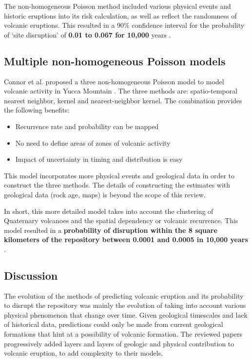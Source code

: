 \documentclass[12pt]{article}
\begin{document}
The non-homogeneous Poisson method included various physical events and historic eruptions
into its risk calculation, as well as reflect the randomness of volcanic eruptions.
This resulted in a 90\% confidence interval for the probability of `site disruption'
of \textbf{0.01 to 0.067 for 10,000} years \cite{ho_risk_1992}.

\subsection{Multiple non-homogeneous Poisson models}
Connor et al. proposed a three non-homogeneous Poisson model
to model volcanic activity in Yucca Mountain \cite{connor_three_1995}.
The three methods are: spatio-temporal nearest neighbor,
kernel and nearest-neighbor kernel. The combination provides
the following benefits:
\begin{itemize}
    \item Recurrence rate and probability can be mapped \\
    \item No need to define areas of zones of volcanic activity \\
    \item Impact of uncertainty in timing and distribution is easy \\
\end{itemize}

This model incorporates more physical events and geological data 
in order to construct the three methods. The details of constructing 
the estimates with geological data (rock age, maps) is beyond the scope
of this review.

In short, this more detailed model takes into account the 
clustering of Quaternary volcanoes and the spatial dependency
or volcanic recurrence. This model resulted in a \textbf{ probability
of disruption within the 8 square kilometers of the repository
between 0.0001 and 0.0005 in 10,000 years} \cite{connor_three_1995}.


\subsection{Discussion}
The evolution of the methods of predicting volcanic eruption
and its probability to disrupt the repository was mainly
the evolution of taking into account various physical phenomenon
that change over time. Given geological timescales and lack
of historical data, predictions could only be made from current
geological formations that hint at a possibility of volcanic formation.
The reviewed papers progressively added layers and layers of geologic
and physical contribution to volcanic eruption, to add complexity to
their models.
\end{document}
